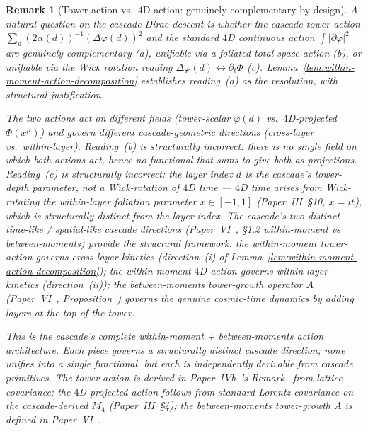 \documentclass[12pt,a4paper]{article}
\newtheorem*{remark}{Remark}
\begin{document}
\begin{remark}[Tower-action vs.\ $4$D action: genuinely complementary by design]
\label{rem:tower-vs-4d-resolved}
A natural question on the cascade Dirac descent is whether the
cascade tower-action $\sum_d (2\alpha(d))^{-1}(\Delta\varphi(d))^2$
and the standard $4$D continuous action
$\int|\partial\varphi|^2$ are genuinely complementary (a), unifiable
via a foliated total-space action (b), or unifiable via the Wick
rotation reading $\Delta\varphi(d) \leftrightarrow \partial_t\Phi$ (c).
Lemma~\ref{lem:within-moment-action-decomposition} establishes
reading~(a) as the resolution, with structural justification.

The two actions act on \emph{different fields} (tower-scalar
$\varphi(d)$ vs.\ $4$D-projected $\Phi(x^\mu)$) and govern
\emph{different cascade-geometric directions} (cross-layer vs.\
within-layer). Reading~(b) is structurally incorrect: there is no
single field on which both actions act, hence no functional that
sums to give both as projections. Reading~(c) is structurally
incorrect: the layer index $d$ is the cascade's tower-depth
parameter, not a Wick-rotation of $4$D time --- $4$D time arises
from Wick-rotating the within-layer foliation parameter
$x \in [-1,1]$ (Paper~III~\S10, $x = it$), which is structurally
distinct from the layer index. The cascade's two distinct
time-like / spatial-like cascade directions
(Paper~VI~\cite{part6}, \S1.2 within-moment vs
between-moments) provide the structural framework: the
within-moment tower-action governs cross-layer kinetics
(direction~(i) of
Lemma~\ref{lem:within-moment-action-decomposition}); the
within-moment $4$D action governs within-layer kinetics
(direction~(ii)); the between-moments tower-growth operator
$A$ (Paper~VI~\cite{part6},
Proposition~) governs the genuine
cosmic-time dynamics by adding layers at the top of the tower.

This is the cascade's complete within-moment + between-moments
action architecture. Each piece governs a structurally distinct
cascade direction; none unifies into a single functional, but
each is independently derivable from cascade primitives. The
tower-action is derived in Paper~IVb~\cite{part4b}'s
Remark~ from lattice covariance;
the $4$D-projected action follows from standard Lorentz
covariance on the cascade-derived $M_4$
(Paper~III~\S4); the between-moments tower-growth $A$ is
defined in Paper~VI~\cite{part6}.
\end{remark}
\end{document}

